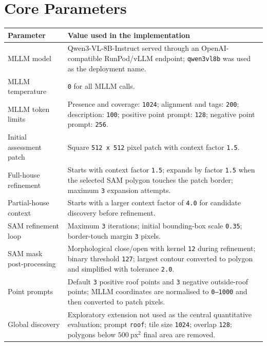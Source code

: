 \newpage

\section{Core Parameters}\thispagestyle{rmplain}
\label{app:core_parameters}
\setcounter{figure}{0}
\setcounter{table}{0}

\begin{table}[htb]
\centering
\footnotesize
\begin{tabular}{|p{}|p{}|}
\hline
\textbf{Parameter} & \textbf{Value used in the implementation} \\
\hline
MLLM model & Qwen3-VL-8B-Instruct served through an OpenAI-compatible RunPod/vLLM endpoint; \texttt{qwen3vl8b} was used as the deployment name. \\
\hline
MLLM temperature & \texttt{0} for all MLLM calls. \\
\hline
MLLM token limits & Presence and coverage: \texttt{1024}; alignment and tags: \texttt{200}; description: \texttt{100}; positive point prompt: \texttt{128}; negative point prompt: \texttt{256}. \\
\hline
Initial assessment patch & Square \texttt{512 x 512} pixel patch with context factor \texttt{1.5}. \\
\hline
Full-house refinement & Starts with context factor \texttt{1.5}; expands by factor \texttt{1.5} when the selected SAM polygon touches the patch border; maximum \texttt{3} expansion attempts. \\
\hline
Partial-house context & Starts with a larger context factor of \texttt{4.0} for candidate discovery before refinement. \\
\hline
SAM refinement loop & Maximum \texttt{3} iterations; initial bounding-box scale \texttt{0.35}; border-touch margin \texttt{3} pixels. \\
\hline
SAM mask post-processing & Morphological close/open with kernel \texttt{12} during refinement; binary threshold \texttt{127}; largest contour converted to polygon and simplified with tolerance \texttt{2.0}. \\
\hline
Point prompts & Default \texttt{3} positive roof points and \texttt{3} negative outside-roof points; MLLM coordinates are normalised to \texttt{0--1000} and then converted to patch pixels. \\
\hline
Global discovery & Exploratory extension not used as the central quantitative evaluation; prompt \texttt{roof}; tile size \texttt{1024}; overlap \texttt{128}; polygons below $500~\mathrm{px}^{2}$ final area are removed. \\

\end{tabular}
\end{table}
